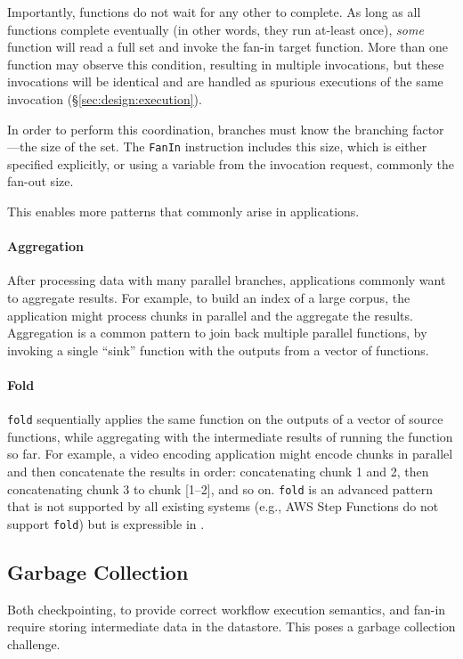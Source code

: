 Importantly, functions do not wait for any other to complete. As long as all
functions complete eventually (in other words, they run at-least once),
\emph{some} function will read a full set and invoke the fan-in target function.
More than one function may observe this condition, resulting in multiple
invocations, but these invocations will be identical and are handled as spurious
executions of the same invocation (\S\ref{sec:design:execution}).

In order to perform this coordination, branches must know the branching
factor---the size of the set. The \texttt{FanIn} instruction includes this size,
which is either specified explicitly, or using a variable from the invocation
request, commonly the fan-out size.


This enables more patterns that commonly arise in applications.

\paragraph{Aggregation}
After processing data with many parallel branches, applications commonly want to
aggregate results. For example, to build an index of a large corpus, the
application might process chunks in parallel and the aggregate the results.
Aggregation is a common pattern to join back multiple parallel functions, by
invoking a single ``sink'' function with the outputs from a vector of functions.

\paragraph{Fold}
\texttt{fold} sequentially applies the same function on the outputs of a vector
of source functions, while aggregating with the intermediate results of running
the function so far. For example, a video encoding application might encode
chunks in parallel and then concatenate the results in order: concatenating
chunk 1 and 2, then concatenating chunk 3 to chunk [1--2], and so on.
\texttt{fold} is an advanced pattern that is not supported by all existing
systems (e.g., AWS Step Functions do not support \texttt{fold}) but is
expressible in \name{}.


\subsection{Garbage Collection}\label{sec:design:garbage}

Both checkpointing, to provide correct workflow execution semantics, and fan-in
require storing intermediate data in the datastore. This poses a garbage
collection challenge.

